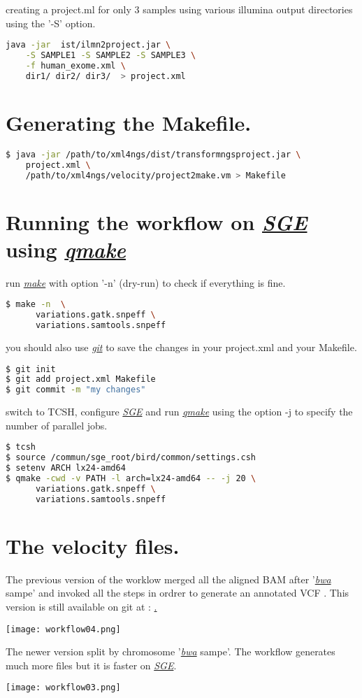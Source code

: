 \documentclass{article}
\newcommand{\sge}{\href{http://gridscheduler.sourceforge.net}{\em{SGE}}}
\newcommand{\git}{\href{https://github.com/}{\em{git}}}
\newcommand{\qmake}{\href{http://gridscheduler.sourceforge.net/htmlman/htmlman1/qmake.html}{\em{qmake}}}
\newcommand{\make}{\href{http://www.gnu.org/software/make/manual/make.html}{\em{make}}}
\newcommand{\bwa}{\href{http:/todo.org/}{\em{bwa}}}
\newcommand{\VCF}{VCF}
\begin{document}
creating a project.ml for only 3 samples using various illumina output directories using the '-S' option.

\begin{lstlisting}[language=bash]
 java -jar  ist/ilmn2project.jar \
 	-S SAMPLE1 -S SAMPLE2 -S SAMPLE3 \
 	-f human_exome.xml \
 	dir1/ dir2/ dir3/  > project.xml
\end{lstlisting}

\section{Generating the Makefile.}
\begin{lstlisting}[language=bash]
$ java -jar /path/to/xml4ngs/dist/transformngsproject.jar \
 	project.xml \
 	/path/to/xml4ngs/velocity/project2make.vm > Makefile
\end{lstlisting}

\section{Running the workflow on \sge{} using \qmake{}}
run \make{} with option '-n' (dry-run) to check if everything is fine.
\begin{lstlisting}[language=bash]
$ make -n  \
      variations.gatk.snpeff \
      variations.samtools.snpeff
\end{lstlisting}

you should also use \git{} to save the changes in your project.xml and your Makefile.
\begin{lstlisting}[language=bash]
$ git init
$ git add project.xml Makefile
$ git commit -m "my changes"
\end{lstlisting}
switch to TCSH, configure \sge{} and run \qmake{} using the option -j to specify the number of parallel jobs.
\begin{lstlisting}[language=bash]
$ tcsh
$ source /commun/sge_root/bird/common/settings.csh
$ setenv ARCH lx24-amd64
$ qmake -cwd -v PATH -l arch=lx24-amd64 -- -j 20 \
      variations.gatk.snpeff \
      variations.samtools.snpeff
\end{lstlisting}

\section{The velocity files.}
The previous version of the worklow merged all the aligned BAM after '\bwa{} sampe' and invoked all the steps in ordrer to generate an
annotated \VCF{} . This version is still available on git at : \href{http://github.com/todo}.
\begin{center}
\texttt{[image: workflow04.png]}
\end{center}
The newer version split by chromosome  '\bwa{} sampe'. The workflow generates much more files but it is faster on \sge{}.
\begin{center}
\texttt{[image: workflow03.png]}
\end{center}
\end{document}
